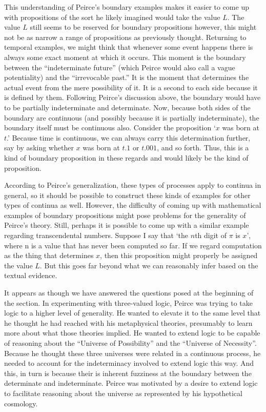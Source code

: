 This understanding of Peirce's boundary examples makes it easier to come up with propositions of the sort he likely imagined would take the value $L$. The value $L$ still seems to be reserved for boundary propositions however, this might not be as narrow a range of propositions as previously thought. Returning to temporal examples, we might think that whenever some event happens there is always some exact moment at which it occurs. This moment is the boundary between the ``indeterminate future'' (which Peirce would also call a vague potentiality) and the ``irrevocable past.'' It is the moment that determines the actual event from the mere possibility of it. It is a second to each side because it is defined by them. Following Peirce's discussion above, the boundary would have to be partially indeterminate and determinate. Now, because both sides of the boundary are continuous (and possibly because it is partially indeterminate), the boundary itself must be continuous also. Consider the proposition `$x$ was born at $t$.' Because time is continuous, we can always carry this determination further, say by asking whether $x$ was born at $t.1$ or $t.001$, and so forth. Thus, this is a kind of boundary proposition in these regards and would likely be the kind of proposition. 

According to Peirce's generalization, these types of processes apply to continua in general, so it should be possible to construct these kinds of examples for other types of continua as well. However, the difficulty of coming up with mathematical examples of boundary propositions might pose problems for the generality of Peirce's theory. Still, perhaps it is possible to come up with a similar example regarding transcendental numbers. Suppose I say that `the $n$th digit of $\pi$ is $x$', where n is a value that has never been computed so far. If we regard computation as the thing that determines $x$, then this proposition might properly be assigned the value $L$. But this goes far beyond what we can reasonably infer based on the textual evidence.

It appears as though we have answered the questions posed at the beginning of the section. In experimenting with three-valued logic, Peirce was trying to take logic to a higher level of generality. He wanted to elevate it to the same level that he thought he had reached with his metaphysical theories, presumably to learn more about what those theories implied. He wanted to extend logic to be capable of reasoning about the ``Universe of Possibility'' and the ``Universe of Necessity''. Because he thought these three universes were related in a continuous process, he needed to account for the indeterminacy involved to extend logic this way. And this, in turn is because their is inherent fuzziness at the boundary between the determinate and indeterminate. Peirce was motivated by a desire to extend logic to facilitate reasoning about the universe as represented by his hypothetical cosmology.
